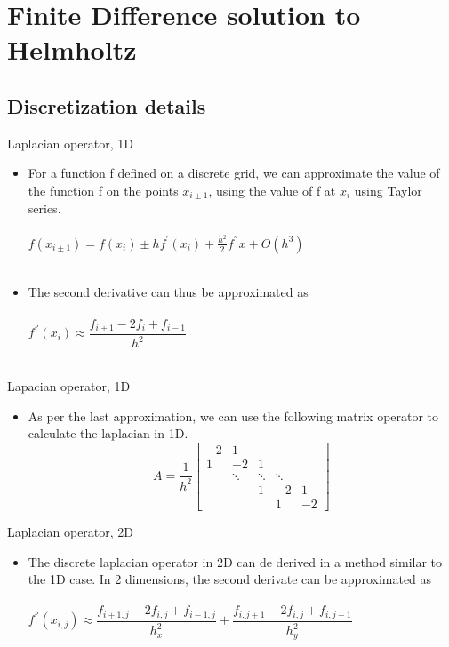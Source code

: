 \documentclass{beamer}
\begin{document}
\section{Finite Difference solution to Helmholtz}
\subsection{Discretization details}
\begin{frame}{Laplacian operator, 1D}
\begin{itemize}
	\item For a function f defined on a discrete grid, we can approximate the value of the function f on the points $x_{i\pm1}$, using the value of f at $x_{i}$ using Taylor series. 
	\\~\\
		\qquad $f(x_{i\pm1}) = f(x_{i}) \pm hf^{'}(x_{i})+\frac{h^{2}}{2}f^{''}x+O(h^{3})$
	\\~\\		
	\item The second derivative can thus be approximated as 
	\\~\\
		\qquad $f^{''}(x_{i}) \approx \dfrac{f_{i+1}-2f_{i}+f_{i-1}}{h^{2}}$
	\\~\\		
		
\end{itemize}
\end{frame}

\begin{frame}{Lapacian operator, 1D}
\begin{itemize}
	\item As per the last approximation, we can use the following matrix operator to calculate the laplacian in 1D.
	\[A = \frac{1}{h^{2}}
	\begin{bmatrix}
	-2 & 1  & & &  \\
	1  & -2 & 1 & & \\
	&\ddots & \ddots & \ddots &\\
	&&1  & -2 & 1\\
	&&& 1 & -2
	\end{bmatrix}
	\]
\end{itemize}
\end{frame}

\begin{frame}{Laplacian operator, 2D}
\begin{itemize}
	\item The discrete laplacian operator in 2D can de derived in a method similar to the 1D case. In 2 dimensions, the second derivate can be approximated as 
	\\~\\
		\qquad $f^{''}(x_{i,j}) \approx \dfrac{f_{i+1,j}-2f_{i,j}+f_{i-1,j}}{h_x^{2}}+
		\dfrac{f_{i,j+1}-2f_{i,j}+f_{i,j-1}}{h_y^{2}}$
	\\~\\
\end{itemize}
\end{frame}
\end{document}
